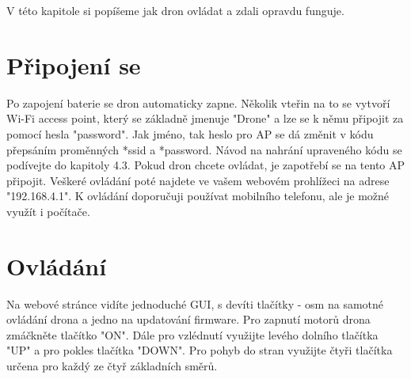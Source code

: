 V této kapitole si popíšeme jak dron ovládat a zdali opravdu funguje.

\section{Připojení se}
    Po zapojení baterie se dron automaticky zapne. Několik vteřin na to se vytvoří Wi-Fi access point, který se základně jmenuje "Drone" a lze se k němu připojit za pomocí hesla "password". Jak jméno, tak heslo pro AP se dá změnit v kódu přepsáním proměnných *ssid a *password. Návod na nahrání upraveného kódu se podívejte do kapitoly 4.3. Pokud dron chcete ovládat, je zapotřebí se na tento AP připojit. Veškeré ovládání poté najdete ve vašem webovém prohlížeci na  adrese "192.168.4.1". K ovládání doporučuji používat mobilního telefonu, ale je možné využít i počítače.

\section{Ovládání}
    Na webové stránce vidíte jednoduché GUI, s devíti tlačítky - osm na samotné ovládání drona a jedno na updatování firmware. Pro zapnutí motorů drona zmáčkněte tlačítko "ON". Dále pro vzlédnutí využijte levého dolního tlačítka "UP" a pro pokles tlačítka "DOWN". Pro pohyb do stran využijte čtyři tlačítka určena pro každý ze čtyř základních směrů.
    
\vspace{5mm}

